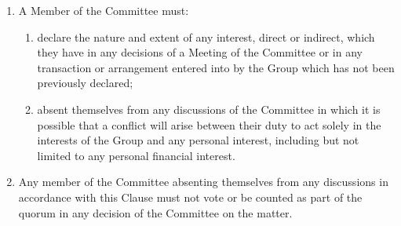 \documentclass[12pt]{constitution}
\begin{document}

\label{clause:conflicts-interest-loyalities}

\begin{enumerate}
    \item A Member of the Committee must:
    \begin{enumerate}
        \item declare the nature and extent of any interest, direct or indirect, which they have in any decisions of a Meeting of the Committee or in any transaction or arrangement entered into by the Group which has not been previously declared;
        \item absent themselves from any discussions of the Committee in which it is possible that a conflict will arise between their duty to act solely in the interests of the Group and any personal interest, including but not limited to any personal financial interest.
    \end{enumerate}

    \item Any member of the Committee absenting themselves from any discussions in accordance with this Clause must not vote or be counted as part of the quorum in any decision of the Committee on the matter.
\end{enumerate}


\label{clause:votes-of-no-confidence}
\end{document}
